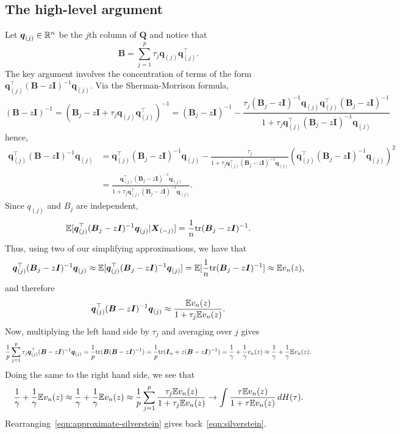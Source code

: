 \documentclass{article}
\newcommand{\bq}{\boldsymbol{q}}
\newcommand{\bX}{\boldsymbol{X}}
\newcommand{\bB}{\boldsymbol{B}}
\newcommand{\bQ}{\boldsymbol{Q}}
\newcommand{\bI}{\boldsymbol{I}}
\begin{document}
\subsection{The high-level argument}
Let $\bq_{(j)} \in \Reals^{n}$ be the $j$th column of $\bQ$ and notice that 
$$
\bB = \sum_{j = 1}^{p} \tau_j \bq_{(j)} \bq_{(j)}^{\top}.
$$
The key argument involves the concentration of terms of the form $\bq_{(j)}^{\top} (\bB - z\bI)^{-1} \bq_{(j)}$. Via the Sherman-Morrison formula, 
$$
(\bB - z\bI)^{-1} 
= (\bB_j -  z \bI + \tau_j \bq_{(j)} \bq_{(j)}^{\top})^{-1} 
= (\bB_j - z\bI)^{-1} - \frac{\tau_j (\bB_j - z\bI)^{-1} \bq_{(j)} \bq_{(j)}^{\top} (\bB_j - z\bI)^{-1}}{1 + \tau_j \bq_{(j)}^{\top}(\bB_j - z\bI)^{-1}\bq_{(j)}}
$$
hence,
\begin{align*}
\bq_{(j)}^{\top} (\bB - z\bI)^{-1} \bq_{(j)} 
& = \bq_{(j)}^{\top} (\bB_j - z\bI)^{-1} \bq_{(j)} - \frac{\tau_j}{1 + \tau_j \bq_{(j)}^{\top}(\bB_j - z\bI)^{-1}\bq_{(j)}} (\bq_{(j)}^{\top} (\bB_j - z\bI)^{-1} \bq_{(j)})^2 \\
& = \frac{\bq_{(j)}^{\top} (\bB_j - z\bI)^{-1} \bq_{(j)}}{1 + \tau_j \bq_{(j)}^{\top}(\bB_j - z\bI)^{-1}\bq_{(j)}}.
\end{align*}
Since $q_{(j)}$ and $B_j$ are independent,
$$
\mathbb{E}[\bq_{(j)}^{\top} (\bB_j - z\bI)^{-1} \bq_{(j)}|\bX_{(-j)}] =  \frac{1}{n}\tr(\bB_j - z\bI)^{-1}.
$$
Thus, using two of our simplifying approximations, we have that
$$
\bq_{(j)}^{\top} (\bB_j - z\bI)^{-1} \bq_{(j)}  \approx \mathbb{E}[\bq_{(j)}^{\top} (\bB_j - z\bI)^{-1} \bq_{(j)}] = \E[\frac{1}{n}\tr(\bB_j - z\bI)^{-1}]  \approx \mathbb{E}v_n(z),
$$
and therefore
$$
\bq_{(j)}^{\top} (\bB - z\bI)^{-1} \bq_{(j)} \approx \frac{\E v_n(z)}{1 + \tau_j \E v_n(z)}.
$$
Now, multiplying the left hand side by $\tau_j$ and averaging over $j$ gives
$$
\frac{1}{p}\sum_{j = 1}^{p} \tau_j \bq_{(j)}^{\top} (\bB - z\bI)^{-1} \bq_{(j)} = \frac{1}{p} \tr(\bB (\bB - z\bI)^{-1}) 
= \frac{1}{p} \tr(\bI_n + z (\bB - z\bI)^{-1} ) = \frac{1}{\gamma} + \frac{1}{\gamma} v_n(z)
\approx \frac{1}{\gamma} + \frac{1}{\gamma}\E v_n(z).
$$
Doing the same to the right hand side, we see that
\begin{equation}
\label{eqn:approximate-silverstein}
\frac{1}{\gamma} + \frac{1}{\gamma} \mathbb{E} v_n(z) \approx \frac{1}{\gamma} + \frac{1}{\gamma}\mathbb{E} v_n(z) \approx \frac{1}{p} \sum_{j = 1}^{p} \frac{\tau_j \mathbb{E} v_n(z)}{1 + \tau_j \mathbb{E} v_n(z)} \to \int \frac{\tau \mathbb{E} v_n(z)}{1 + \tau \mathbb{E} v_n(z)} \,dH(\tau).
\end{equation}
Rearranging~\eqref{eqn:approximate-silverstein} gives back~\eqref{eqn:silverstein}.
\end{document}
